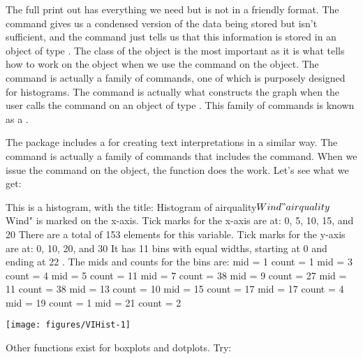  
The full print out has everything we need but is not in a friendly format. The  command gives us a condensed version of the data being stored but isn't sufficient, and the  command just tells us that this information is stored in an object of type . The class of the object is the most important as it is what tells \R{} how to work on the object when we use the  command on the  object. The  command is actually a family of commands, one of which is purposely designed for histograms. The  command is actually what constructs the graph when the user calls the  command on an object of type . This family of commands is known as a . 
 
The  package includes a  for creating text interpretations in a similar way. The  command is actually a family of commands that includes the  command. When we issue the  command on the  object, the  function does the work. Let's see what we get: 
\begin{Schunk}
\begin{Soutput}
This is a histogram, with the title: Histogram of airquality$Wind
"airquality$Wind" is marked on the x-axis.
Tick marks for the x-axis are at: 0, 5, 10, 15, and 20 
There are a total of 153 elements for this variable.
Tick marks for the y-axis are at: 0, 10, 20, and 30 
It has 11 bins with equal widths, starting at 0 and ending at 22 .
The mids and counts for the bins are:
mid = 1  count = 1 
mid = 3  count = 4 
mid = 5  count = 11 
mid = 7  count = 38 
mid = 9  count = 27 
mid = 11  count = 38 
mid = 13  count = 10 
mid = 15  count = 17 
mid = 17  count = 4 
mid = 19  count = 1 
mid = 21  count = 2
\end{Soutput}
\end{Schunk}
\texttt{[image: figures/VIHist-1]} 


 
 
Other functions exist for boxplots and dotplots. Try: 

